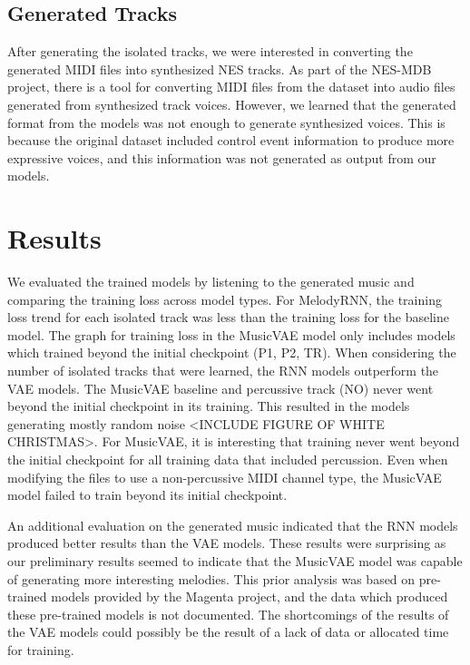 \documentclass{article}
\begin{document}

\subsection{Generated Tracks}
After generating the isolated tracks, we were interested in converting the generated MIDI files into synthesized NES tracks. As part of the NES-MDB project, there is a tool for converting MIDI files from the dataset into audio files generated from synthesized track voices. However, we learned that the generated format from the models was not enough to generate synthesized voices. This is because the original dataset included control event information to produce more expressive voices, and this information was not generated as output from our models.


\section{Results}

We evaluated the trained models by listening to the generated music and comparing the training loss across model types. For MelodyRNN, the training loss trend for each isolated track was less than the training loss for the baseline model. The graph for training loss in the MusicVAE model only includes models which trained beyond the initial checkpoint (P1, P2, TR). When considering the number of isolated tracks that were learned, the RNN models outperform the VAE models. The MusicVAE baseline and percussive track (NO) never went beyond the initial checkpoint in its training. This resulted in the models generating mostly random noise <INCLUDE FIGURE OF WHITE CHRISTMAS>. For MusicVAE, it is interesting that training never went beyond the initial checkpoint for all training data that included percussion. Even when modifying the files to use a non-percussive MIDI channel type, the MusicVAE model failed to train beyond its initial checkpoint.


An additional evaluation on the generated music indicated that the RNN models produced better results than the VAE models. These results were surprising as our preliminary results seemed to indicate that the MusicVAE model was capable of generating more interesting melodies. This prior analysis was based on pre-trained models provided by the Magenta project, and the data which produced these pre-trained models is not documented. The shortcomings of the results of the VAE models could possibly be the result of a lack of data or allocated time for training.
\end{document}
